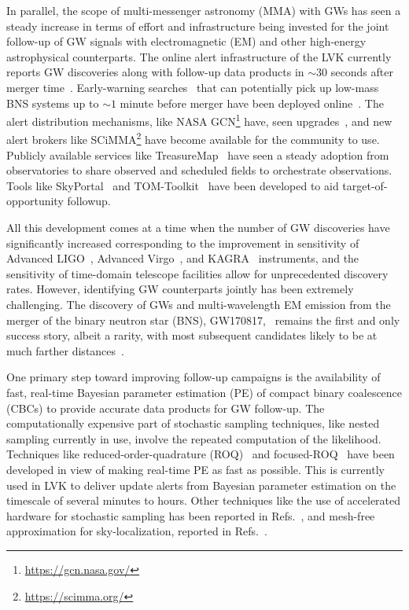 \begin{refsection}
In parallel, the scope of multi-messenger astronomy (MMA) with GWs has seen a steady increase in terms of effort and infrastructure being invested for the joint follow-up of GW signals with electromagnetic (EM) and other high-energy astrophysical counterparts. 
The online alert infrastructure of the LVK currently reports GW discoveries along with follow-up data products in $\sim 30$ seconds after merger time~\cite{Chaudhary_2024}. Early-warning searches~\cite{Cannon_2012} that can potentially pick up low-mass BNS systems up to $\sim 1$ minute before merger have been deployed online~\cite{Magee_2021}. 
The alert distribution mechanisms, like NASA GCN\footnote{\url{https://gcn.nasa.gov/}} have, seen upgrades~\cite{2022GCN.32419....1B}, and new alert brokers like SCiMMA\footnote{\url{https://scimma.org/}} have become available for the community to use.
Publicly available services like TreasureMap~\cite{2019GCN.26244....1W} have seen a steady adoption from observatories to share observed and scheduled fields to orchestrate observations. 
Tools like SkyPortal~\cite{skyportal2019} and TOM-Toolkit~\cite{tom_toolkit} have been developed to aid target-of-opportunity followup. 

All this development comes at a time when the number of GW discoveries have significantly increased corresponding to the improvement in sensitivity of Advanced LIGO~\cite{PhysRevD.102.062003, Aasi_2015}, Advanced Virgo~\cite{Acernese_2015}, and KAGRA~\cite{kagra} instruments, and the sensitivity of time-domain telescope facilities allow for unprecedented discovery rates. 
However, identifying GW counterparts jointly has been extremely challenging. 
The discovery of GWs and multi-wavelength EM emission from the merger of the binary neutron star (BNS), GW170817,~\cite{AbEA2017b, AbEA2017f} remains the first and only success story, albeit a rarity, with most subsequent candidates likely to be at much farther distances~\cite{2020NatAs...4..550C}. 

One primary step toward improving follow-up campaigns is the availability of fast, real-time Bayesian parameter estimation (PE) of compact binary coalescence (CBCs) to provide accurate data products for GW follow-up. 
The computationally expensive part of stochastic sampling techniques, like nested sampling currently in use, involve the repeated computation of the likelihood. 
Techniques like reduced-order-quadrature (ROQ)~\cite{Canizares:2014fya, morisaki2023rapidlocalizationinferencecompact} and focused-ROQ~\cite{Morisaki:2020oqk} have been developed in view of making real-time PE as fast as possible. 
This is currently used in LVK to deliver update alerts from Bayesian parameter estimation on the timescale of several minutes to hours. 
Other techniques like the use of accelerated hardware for stochastic sampling has been reported in Refs.~\cite{Talbot:2019okv, wong2023fastgravitationalwaveparameter}, and mesh-free approximation for sky-localization, reported in Refs.~\cite{PhysRevD.108.064055, PhysRevD.109.024053}.


\end{refsection}
